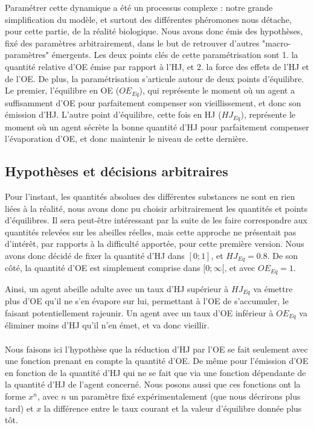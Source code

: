 	Paramétrer cette dynamique a été un processus complexe : notre grande simplification du modèle, et surtout des différentes phéromones nous détache, pour cette partie, de la réalité biologique. Nous avons donc émis des hypothèses, fixé des paramètres arbitrairement, dans le but de retrouver d'autres "macro-paramètres" émergents. Les deux points clés de cette paramétrisation sont 1. la quantité relative d'OE émise par rapport à l'HJ, et 2. la force des effets de l'HJ et de l'OE. De plus, la paramétrisation s'articule autour de deux points d'équilibre. Le premier, l'équilibre en OE ($OE_{Eq}$), qui représente le moment où un agent a suffisamment d'OE pour parfaitement compenser son vieillissement, et donc son émission d'HJ. L'autre point d'équilibre, cette fois en HJ ($HJ_{Eq}$), représente le moment où un agent sécrète la bonne quantité d'HJ pour parfaitement compenser l'évaporation d'OE, et donc maintenir le niveau de cette dernière.
	
	\subsection{Hypothèses et décisions arbitraires}
	Pour l'instant, les quantités absolues des différentes substances ne sont en rien liées à la réalité, nous avons donc pu choisir arbitrairement les quantités et points d'équilibres. Il sera peut-être intéressant par la suite de les faire correspondre aux quantités relevées sur les abeilles réelles, mais cette approche ne présentait pas d'intérêt, par rapports à la difficulté apportée, pour cette première version. Nous avons donc décidé de fixer la quantité d'HJ dans $[0;1]$, et $HJ_{Eq} = 0.8$. De son côté, la quantité d'OE est simplement comprise dans $[0;\infty[$, et avec $OE_{Eq} = 1$. 
	
	Ainsi, un agent abeille adulte avec un taux d'HJ supérieur à $HJ_{Eq}$ va émettre plus d'OE qu'il ne s'en évapore sur lui, permettant à l'OE de s'accumuler, le faisant potentiellement rajeunir. Un agent avec un taux d'OE inférieur à $OE_{Eq}$ va éliminer moins d'HJ qu'il n'en émet, et va donc vieillir.
	
	\paragraph{}
	Nous faisons ici l'hypothèse que la réduction d'HJ par l'OE se fait seulement avec une fonction prenant en compte la quantité d'OE. De même pour l'émission d'OE en fonction de la quantité d'HJ qui ne se fait que via une fonction dépendante de la quantité d'HJ de l'agent concerné. Nous posons aussi que ces fonctions ont la forme $x^n$, avec $n$ un paramètre fixé expérimentalement (que nous décrirons plus tard) et $x$ la différence entre le taux courant et la valeur d'équilibre donnée plus tôt.
	
